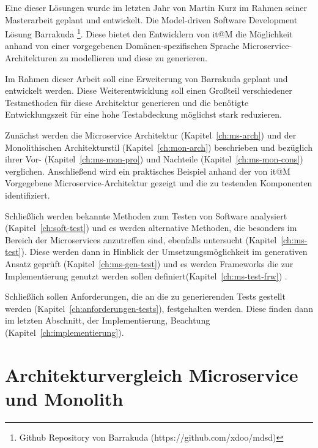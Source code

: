 \documentclass[12pt,a4paper,bibliography=totocnumbered,listof=totocnumbered]{scrartcl}
\begin{document}
Eine dieser Lösungen wurde im letzten Jahr von Martin Kurz im Rahmen seiner Masterarbeit \cite{mkthesis} geplant und entwickelt. Die Model-driven Software Development Lösung Barrakuda \footnote{Github Repository von Barrakuda (https://github.com/xdoo/mdsd)}. Diese bietet den Entwicklern von it@M die Möglichkeit anhand von einer vorgegebenen Domänen-spezifischen Sprache Microservice-Architekturen zu modellieren und diese zu generieren.

Im Rahmen dieser Arbeit soll eine Erweiterung von Barrakuda geplant und entwickelt werden. Diese Weiterentwicklung soll einen Großteil verschiedener Testmethoden für diese Architektur generieren und die benötigte Entwicklungszeit für eine hohe Testabdeckung möglichst stark reduzieren.

Zunächst werden die Microservice Architektur (Kapitel~\ref{ch:ms-arch}) und der Monolithischen Architekturstil (Kapitel~\ref{ch:mon-arch}) beschrieben und bezüglich ihrer Vor- (Kapitel~\ref{ch:ms-mon-pro}) und Nachteile (Kapitel~\ref{ch:ms-mon-cons}) verglichen. Anschließend wird ein praktisches Beispiel anhand der von it@M Vorgegebene Microservice-Architektur gezeigt und die zu testenden Komponenten identifiziert.

Schließlich werden bekannte Methoden zum Testen von Software analysiert (Kapitel~\ref{ch:soft-test}) und es werden alternative Methoden, die besonders im Bereich der Microservices anzutreffen sind, ebenfalls untersucht (Kapitel~\ref{ch:ms-test}). Diese werden dann in Hinblick der Umsetzungsmöglichkeit im generativen Ansatz geprüft (Kapitel~\ref{ch:ms-gen-test})  und es werden Frameworks die zur Implementierung genutzt werden sollen definiert(Kapitel~\ref{ch:ms-test-frw}) .

Schließlich sollen Anforderungen, die an die zu generierenden Tests gestellt werden (Kapitel~\ref{ch:anforderungen-tests}), festgehalten werden. Diese finden dann im letzten Abschnitt, der Implementierung, Beachtung (Kapitel~\ref{ch:implementierung}).

\section{Architekturvergleich Microservice und Monolith}
\end{document}
